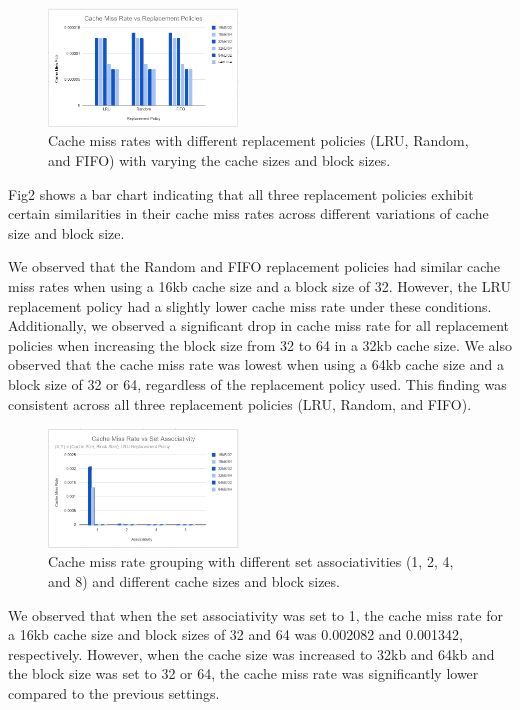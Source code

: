 \documentclass[conference]{IEEEtran}
\begin{document}
\begin{figure}[H]
    \centering
    \includegraphics[width=0.45\textwidth]{sha/sha_cache_vs_repl.png}
    \caption{Cache miss rates with different replacement policies (LRU, Random, and FIFO) with varying the cache sizes and block sizes.}
\end{figure}

Fig2 shows a bar chart indicating that all three replacement policies exhibit certain similarities in their cache miss rates across different variations of cache size and block size.


We observed that the Random and FIFO replacement policies had similar cache miss rates when using a 16kb cache size and a block size of 32. However, the LRU replacement policy had a slightly lower cache miss rate under these conditions. Additionally, we observed a significant drop in cache miss rate for all replacement policies when increasing the block size from 32 to 64 in a 32kb cache size. We also observed that the cache miss rate was lowest when using a 64kb cache size and a block size of 32 or 64, regardless of the replacement policy used. This finding was consistent across all three replacement policies (LRU, Random, and FIFO).

\begin{figure}[H]
    \centering
    \includegraphics[width=0.45\textwidth]{sha/sha_cache_vs_setAssoc.png}
    \caption{Cache miss rate grouping with different set associativities (1, 2, 4, and 8) and different cache sizes and block sizes.}
\end{figure}
We observed that when the set associativity was set to 1, the cache miss rate for a 16kb cache size and block sizes of 32 and 64 was 0.002082 and 0.001342, respectively. However, when the cache size was increased to 32kb and 64kb and the block size was set to 32 or 64, the cache miss rate was significantly lower compared to the previous settings.
\end{document}
